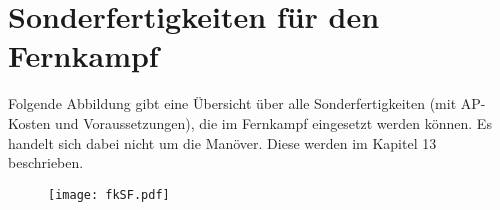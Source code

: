 %


\chapter{Sonderfertigkeiten für den Fernkampf}
Folgende Abbildung gibt eine Übersicht über alle Sonderfertigkeiten (mit AP-Kosten und Voraussetzungen), die im Fernkampf eingesetzt werden können.
Es handelt sich dabei nicht um die Manöver. Diese werden im Kapitel 13 beschrieben.

\begin{figure}
    \centering
    \texttt{[image: fkSF.pdf]}
\end{figure}

